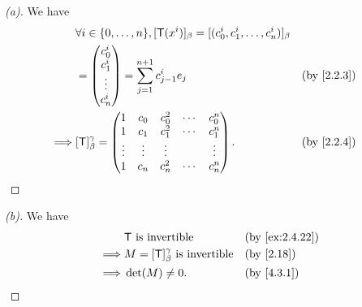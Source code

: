 \begin{proof}[(a)]
  We have
  \begin{align*}
             & \forall i \in \set{0, \dots, n}, [\T(x^i)]_{\beta} = [(c_0^i, c_1^i, \dots, c_n^i)]_{\beta}                   \\
             & = \begin{pmatrix}
                   c_0^i  \\
                   c_1^i  \\
                   \vdots \\
                   c_n^i
                 \end{pmatrix} = \sum_{j = 1}^{n + 1} c_{j - 1}^i e_j                                        &  & \by{2.2.3} \\
    \implies & [\T]_{\beta}^{\gamma} = \begin{pmatrix}
                                         1      & c_0    & c_0^2  & \cdots & c_0^n  \\
                                         1      & c_1    & c_1^2  & \cdots & c_1^n  \\
                                         \vdots & \vdots & \vdots &        & \vdots \\
                                         1      & c_n    & c_n^2  & \cdots & c_n^n
                                       \end{pmatrix}.                                               &  & \by{2.2.4}
  \end{align*}
\end{proof}

\begin{proof}[(b)]
  We have
  \begin{align*}
             & \T \text{ is invertible}                        &  & \by{ex:2.4.22} \\
    \implies & M = [\T]_{\beta}^{\gamma} \text{ is invertible} &  & \by{2.18}      \\
    \implies & \det(M) \neq 0.                                 &  & \by{4.3.1}
  \end{align*}
\end{proof}

